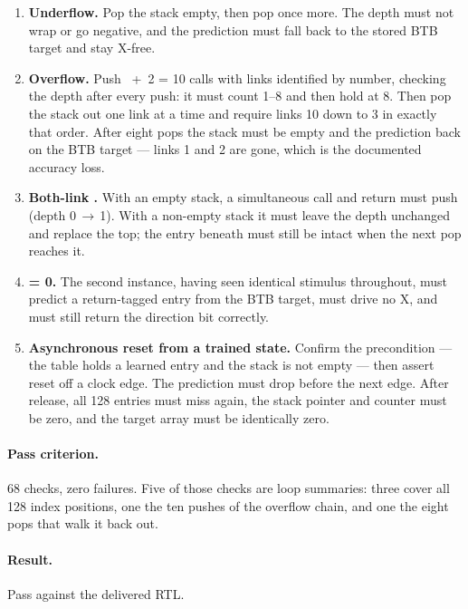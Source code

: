\begin{enumerate}[leftmargin=*,itemsep=3pt]
\item[\textbf{8}] \textbf{Underflow.} Pop the stack empty, then pop once more.
The depth must not wrap or go negative, and the prediction must fall back to the
stored BTB target and stay X-free.

\item[\textbf{9}] \textbf{Overflow.} Push ~+~2 = 10 calls with
links identified by number, checking the depth after every push: it must count
1--8 and then hold at 8. Then pop the stack out one link at a time and require
links 10 down to 3 in exactly that order. After eight pops the stack must be
empty and the prediction back on the BTB target --- links 1 and 2 are gone,
which is the documented accuracy loss.

\item[\textbf{10}] \textbf{Both-link .} With an empty stack, a
simultaneous call and return must push (depth 0\,$\rightarrow$\,1). With a
non-empty stack it must leave the depth unchanged and replace the top; the entry
beneath must still be intact when the next pop reaches it.

\item[\textbf{11}] \textbf{ = 0.} The second instance, having
seen identical stimulus throughout, must predict a return-tagged entry from the
BTB target, must drive no X, and must still return the direction bit correctly.

\item[\textbf{12}] \textbf{Asynchronous reset from a trained state.} Confirm the
precondition --- the table holds a learned entry and the stack is not empty ---
then assert reset off a clock edge. The prediction must drop before the next
edge. After release, all 128 entries must miss again, the stack pointer and
counter must be zero, and the target array must be identically zero.
\end{enumerate}

\paragraph{Pass criterion.} 68 checks, zero failures. Five of those checks are
loop summaries: three cover all 128 index positions, one the ten pushes of the
overflow chain, and one the eight pops that walk it back out.

\paragraph{Result.} Pass against the delivered RTL.

